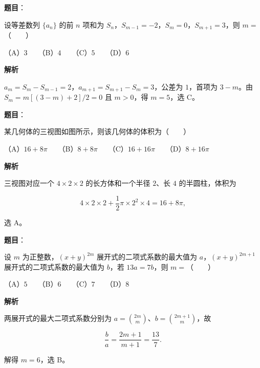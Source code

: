 \begin{answer}

\textbf{题目}：

设等差数列 $\{a_n\}$ 的前 $n$ 项和为 $S_n$，$S_{m-1}=-2$，$S_m=0$，$S_{m+1}=3$，则 $m=$\mbox{（　　）}

（A）$3$　　（B）$4$　　（C）$5$　　（D）$6$

\textbf{解析}

$a_m=S_m-S_{m-1}=2$，$a_{m+1}=S_{m+1}-S_m=3$，公差为 $1$，首项为 $3-m$。由 $S_m=m[(3-m)+2]/2=0$ 且 $m>0$，得 $m=5$，选 C。


\end{answer}
\begin{answer}

\textbf{题目}：

某几何体的三视图如图所示，则该几何体的体积为\mbox{（　　）}
\nopagebreak[4]
\begin{center}\end{center}
\nopagebreak[4]
（A）$16+8\pi$　　（B）$8+8\pi$　　（C）$16+16\pi$　　（D）$8+16\pi$

\textbf{解析}

三视图对应一个 $4\times2\times2$ 的长方体和一个半径 $2$、长 $4$ 的半圆柱，体积为

\nopagebreak[4]
\[
4\times2\times2+\frac12\pi\times2^2\times4=16+8\pi,
\]

选 A。


\end{answer}
\begin{answer}

\textbf{题目}：

设 $m$ 为正整数，$(x+y)^{2m}$ 展开式的二项式系数的最大值为 $a$，$(x+y)^{2m+1}$ 展开式的二项式系数的最大值为 $b$，若 $13a=7b$，则 $m=$\mbox{（　　）}

（A）$5$　　（B）$6$　　（C）$7$　　（D）$8$

\textbf{解析}

两展开式的最大二项式系数分别为 $a=\binom{2m}{m}$、$b=\binom{2m+1}{m}$，故

\nopagebreak[4]
\[
\frac ba=\frac{2m+1}{m+1}=\frac{13}7.
\]

解得 $m=6$，选 B。


\end{answer}
